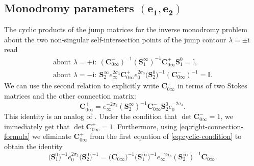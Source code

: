 \documentclass[pdftex]{sigma}
\numberwithin{equation}{section}
\newcommand{\ii}{\mathrm{i}}
\begin{document}
\subsection[Monodromy parameters (e\_1, e\_2)]{Monodromy parameters $\boldsymbol{(e_1, e_2)}$}\label{subsec:cyclic}
The cyclic products of the jump matrices for the inverse monodromy problem about the two non-singular self-intersection points of the jump contour $\lambda=\pm\ii$ read
 \begin{gather}
 \text{about } \lambda=+\ii \colon\ (\mathbf{C}_{0\infty}^-)^{-1}(\mathbf{S}^\infty_{1})^{-1}\mathbf{C}_{0\infty}^+\mathbf{S}^0_{1}=\mathbb{I},\nonumber\\
 \text{about } \lambda=-\ii\colon\
 \mathbf{S}_{2}^\infty e_\infty^{2\sigma_3}\mathbf{C}_{0\infty}^+e_0^{2\sigma_3}\big(\mathbf{S}^0_{2}\big)^{-1}(\mathbf{C}_{0\infty}^-)^{-1}=\mathbb{I}.
 \label{eq:cyclic-condition}
 \end{gather}
 We can use the second relation to explicitly write $\mathbf{C}_{0\infty}^+$ in terms of two Stokes matrices and the other connection matrix:
 \begin{equation} \mathbf{C}_{0\infty}^+=e_\infty^{-2\sigma_3}(\mathbf{S}_{2}^\infty )^{-1}\mathbf{C}_{0\infty}^-\mathbf{S}^0_{2}e_0^{-2\sigma_3}.
 \label{eq:right-connection-formula}
 \end{equation}
This identity is an analog of \cite[equation~(3.17)]{Jimbo}.
 Under the condition that $\det \mathbf{C}_{0\infty}^- = 1$, we immediately get that $\det \mathbf{C}_{0\infty}^+ = 1$. Furthermore, using \eqref{eq:right-connection-formula} we eliminate $\mathbf{C}_{0\infty}^+$ from the first equation of \eqref{eq:cyclic-condition} to obtain the identity
 \begin{equation}
 \big(\mathbf{S}^0_{1}\big)^{-1}e_0^{2\sigma_3}\big(\mathbf{S}_{2}^0 \big)^{-1} = \big(\mathbf{C}_{0\infty}^-\big)^{-1}\big(\mathbf{S}^\infty_{1}\big)^{-1}e_\infty^{-2\sigma_3}(\mathbf{S}_{2}^\infty )^{-1}\mathbf{C}_{0\infty}^-.
 \label{eq:left-connection-identity}
 \end{equation}
\end{document}
